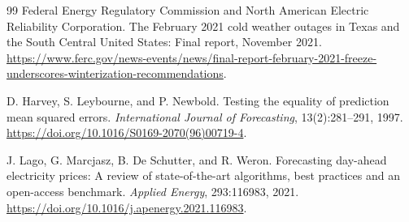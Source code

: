 \documentclass[11pt,letterpaper]{article}
\begin{document}
\begin{thebibliography}{99}
Federal Energy Regulatory Commission and North American Electric Reliability Corporation.
\newblock The February 2021 cold weather outages in Texas and the South Central United States: Final report, November 2021.
\newblock \url{https://www.ferc.gov/news-events/news/final-report-february-2021-freeze-underscores-winterization-recommendations}.

D. Harvey, S. Leybourne, and P. Newbold.
\newblock Testing the equality of prediction mean squared errors.
\newblock \emph{International Journal of Forecasting}, 13(2):281--291, 1997.
\newblock \url{https://doi.org/10.1016/S0169-2070(96)00719-4}.

J. Lago, G. Marcjasz, B. De Schutter, and R. Weron.
\newblock Forecasting day-ahead electricity prices: A review of state-of-the-art algorithms, best practices and an open-access benchmark.
\newblock \emph{Applied Energy}, 293:116983, 2021.
\newblock \url{https://doi.org/10.1016/j.apenergy.2021.116983}.
\end{thebibliography}
\end{document}
